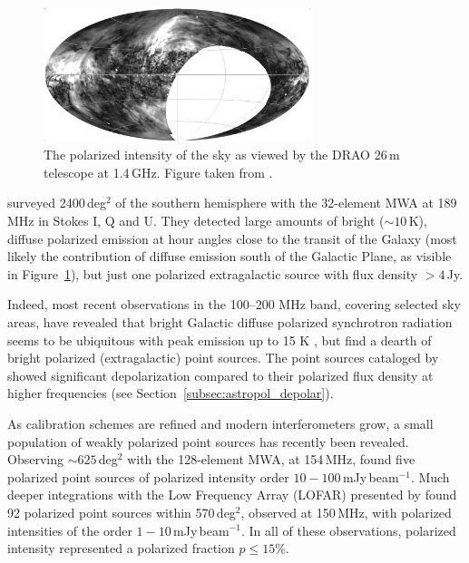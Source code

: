 \begin{figure}
\centering
\includegraphics[width=0.7\textwidth]{chapters/astropol/figures/drao_map.png}
\caption{The polarized intensity of the sky as viewed by the DRAO 26\,m telescope at 1.4\,GHz. Figure taken from \cite{Wolleben.06}.}
\label{fig:astropol_drao_map}
\end{figure}

\cite{Bernardi.13} surveyed 2400\,deg$^2$ of the southern hemisphere with the 32-element MWA at 189\,MHz in Stokes I, Q and U. They detected large amounts of bright ($\sim 10$\,K), diffuse polarized emission at hour angles close to the transit of the Galaxy (most likely the contribution of diffuse emission south of the Galactic Plane, as visible in Figure~\ref{fig:astropol_drao_map}), but just one polarized extragalactic source with flux density $>4$\,Jy. 

Indeed, most recent observations in the 100--200 MHz band, covering selected sky areas, have revealed that bright Galactic diffuse polarized synchrotron radiation seems to be ubiquitous \citep{Bernardi.09, Bernardi.10, Jelic.14, Lenc.16} with peak emission up to 15 K \citep{Jelic.15}, but find a dearth of bright polarized (extragalactic) point sources. The point sources cataloged by \cite{Bernardi.13} showed significant depolarization compared to their polarized flux density at higher frequencies (see Section~\ref{subsec:astropol_depolar}). 

As calibration schemes are refined and modern interferometers grow, a small population of weakly polarized point sources has recently been revealed. Observing $\sim 625$\,deg$^2$ with the 128-element MWA, at 154\,MHz, \cite{Lenc.16} found five polarized point sources of polarized intensity order $10-100$\,mJy\,beam$^{-1}$. Much deeper integrations with the Low Frequency Array (LOFAR) presented by \cite{VanEck.18} found 92 polarized point sources within 570\,deg$^2$, observed at 150\,MHz, with polarized intensities of the  order $1-10$\,mJy\,beam$^{-1}$. In all of these observations, polarized intensity represented a polarized fraction $p\leq 15$\%.

